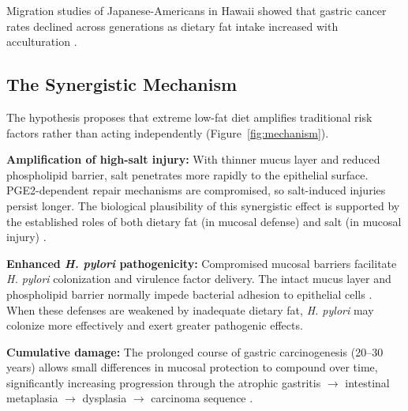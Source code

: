 \documentclass[review]{elsarticle}
\begin{document}
Migration studies of Japanese-Americans in Hawaii showed that gastric cancer rates declined across generations as dietary fat intake increased with acculturation \cite{kolonel1981}.

\subsection{The Synergistic Mechanism}

The hypothesis proposes that extreme low-fat diet amplifies traditional risk factors rather than acting independently (Figure~\ref{fig:mechanism}).

\textbf{Amplification of high-salt injury:} With thinner mucus layer and reduced phospholipid barrier, salt penetrates more rapidly to the epithelial surface. PGE2-dependent repair mechanisms are compromised, so salt-induced injuries persist longer. The biological plausibility of this synergistic effect is supported by the established roles of both dietary fat (in mucosal defense) and salt (in mucosal injury) \cite{delia2012,wallace2008}.

\textbf{Enhanced \textit{H. pylori} pathogenicity:} Compromised mucosal barriers facilitate \textit{H. pylori} colonization and virulence factor delivery. The intact mucus layer and phospholipid barrier normally impede bacterial adhesion to epithelial cells \cite{lichtenberger1995}. When these defenses are weakened by inadequate dietary fat, \textit{H. pylori} may colonize more effectively and exert greater pathogenic effects.

\textbf{Cumulative damage:} The prolonged course of gastric carcinogenesis (20--30 years) allows small differences in mucosal protection to compound over time, significantly increasing progression through the atrophic gastritis $\rightarrow$ intestinal metaplasia $\rightarrow$ dysplasia $\rightarrow$ carcinoma sequence \cite{correa1988}.
\end{document}
